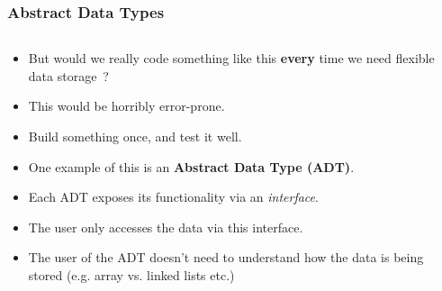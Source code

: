 
\begin{frame}[fragile]
\frametitle{Abstract Data Types}
\begin{columns}[T]

\begin{column}{0.90\textwidth}
\begin{itemize}[<+->]
\item But would we really code something like this {\bf every} time we
need flexible data storage~? 
\item This would be horribly error-prone.
\item Build something once, and test it well.
\item One example of this is an {\bf Abstract Data Type (ADT)}.
\item Each ADT exposes its functionality via an {\em interface}.
\item The user only accesses the data via this interface.
\item The user of the ADT doesn't need to understand how the data is
being stored (e.g. array vs. linked lists etc.)
\end{itemize}
\end{column}

\end{columns}
\end{frame}

